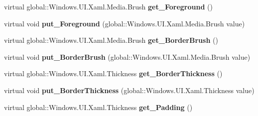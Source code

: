 \begin{DoxyCompactItemize}
virtual global\+::\+Windows.\+U\+I.\+Xaml.\+Media.\+Brush {\bfseries get\+\_\+\+Foreground} ()
\item 
\mbox{\label{class_windows_1_1_u_i_1_1_xaml_1_1_controls_1_1_content_presenter_a68ccfdea494d9893e23a3474cf743417}} 
virtual void {\bfseries put\+\_\+\+Foreground} (global\+::\+Windows.\+U\+I.\+Xaml.\+Media.\+Brush value)
\item 
\mbox{\label{class_windows_1_1_u_i_1_1_xaml_1_1_controls_1_1_content_presenter_a61b2500c86e765bebf6ac61223772af6}} 
virtual global\+::\+Windows.\+U\+I.\+Xaml.\+Media.\+Brush {\bfseries get\+\_\+\+Border\+Brush} ()
\item 
\mbox{\label{class_windows_1_1_u_i_1_1_xaml_1_1_controls_1_1_content_presenter_a1c69dc8d392745cdcb6b5897e6b7faca}} 
virtual void {\bfseries put\+\_\+\+Border\+Brush} (global\+::\+Windows.\+U\+I.\+Xaml.\+Media.\+Brush value)
\item 
\mbox{\label{class_windows_1_1_u_i_1_1_xaml_1_1_controls_1_1_content_presenter_a01beb078f55461afac10e93c0573fed9}} 
virtual global\+::\+Windows.\+U\+I.\+Xaml.\+Thickness {\bfseries get\+\_\+\+Border\+Thickness} ()
\item 
\mbox{\label{class_windows_1_1_u_i_1_1_xaml_1_1_controls_1_1_content_presenter_a113ef90f4f5406729e95bfb55c833966}} 
virtual void {\bfseries put\+\_\+\+Border\+Thickness} (global\+::\+Windows.\+U\+I.\+Xaml.\+Thickness value)
\item 
\mbox{\label{class_windows_1_1_u_i_1_1_xaml_1_1_controls_1_1_content_presenter_ae4482490bff440528c9e385469292658}} 
virtual global\+::\+Windows.\+U\+I.\+Xaml.\+Thickness {\bfseries get\+\_\+\+Padding} ()
\item 
\mbox{\label{class_windows_1_1_u_i_1_1_xaml_1_1_controls_1_1_content_presenter_af19896cc41a8e9a09fb092cd20971040}} 

\end{DoxyCompactItemize}
